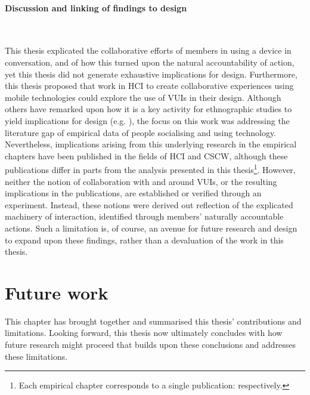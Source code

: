 \newpage\paragraph{Discussion and linking of findings to design} \hfill \\
\begin{revisedsubmission}
This thesis explicated the collaborative efforts of members in using a device in conversation, and of how this turned upon the natural accountability of action, yet this thesis did not generate exhaustive implications for design.
Furthermore, this thesis proposed that work in \ac{HCI} to create collaborative experiences using mobile technologies could explore the use of \acp{VUI} in their design.
Although others have remarked upon how it is a key activity for ethnographic studies to yield implications for design (e.g. \citet{Crabtree2012}), the focus on this work was addressing the literature gap of empirical data of people socialising and using technology.
Nevertheless, implications arising from this underlying research in the empirical chapters have been published in the fields of \ac{HCI} and \ac{CSCW}, although these publications differ in parts from the analysis presented in this thesis\footnote{Each empirical chapter corresponds to a single publication: \citet{Porcheron2016a,Porcheron2017,Porcheron2018} respectively.}.
However, neither the notion of collaboration with and around \acp{VUI}, or the resulting implications in the publications, are established or verified through an experiment.
Instead, these notions were derived out reflection of the explicated machinery of interaction, identified through members' naturally accountable actions.
Such a limitation is, of course, an avenue for future research and design to expand upon these findings, rather than a devaluation of the work in this thesis.
\end{revisedsubmission}






\section{Future work}\label{sec:synopsis conclusions future}
This chapter has brought together and summarised this thesis' contributions and limitations.
Looking forward, this thesis now ultimately concludes with how future research might proceed that builds upon these conclusions and addresses these limitations.


